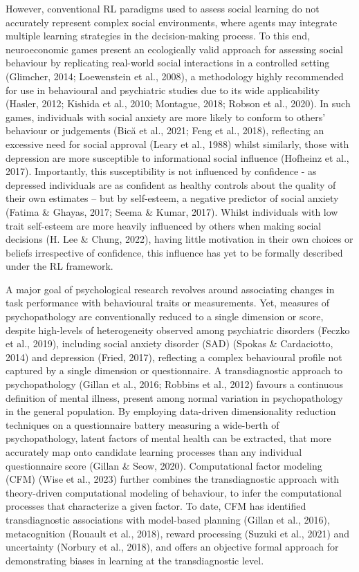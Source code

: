 \documentclass[12pt,a4paper,oneside,]{book} %
\begin{document}
However, conventional RL paradigms used to assess social learning do not accurately represent complex social environments, where agents may integrate multiple learning strategies in the decision-making process. To this end, neuroeconomic games present an ecologically valid approach for assessing social behaviour by replicating real-world social interactions in a controlled setting (Glimcher, 2014; Loewenstein et al., 2008), a methodology highly recommended for use in behavioural and psychiatric studies due to its wide applicability (Hasler, 2012; Kishida et al., 2010; Montague, 2018; Robson et al., 2020). In such games, individuals with social anxiety are more likely to conform to others' behaviour or judgements (Bică et al., 2021; Feng et al., 2018), reflecting an excessive need for social approval (Leary et al., 1988) whilst similarly, those with depression are more susceptible to informational social influence (Hofheinz et al., 2017). Importantly, this susceptibility is not influenced by confidence - as depressed individuals are as confident as healthy controls about the quality of their own estimates -- but by self-esteem, a negative predictor of social anxiety (Fatima \& Ghayas, 2017; Seema \& Kumar, 2017). Whilst individuals with low trait self-esteem are more heavily influenced by others when making social decisions (H. Lee \& Chung, 2022), having little motivation in their own choices or beliefs irrespective of confidence, this influence has yet to be formally described under the RL framework.

A major goal of psychological research revolves around associating changes in task performance with behavioural traits or measurements. Yet, measures of psychopathology are conventionally reduced to a single dimension or score, despite high-levels of heterogeneity observed among psychiatric disorders (Feczko et al., 2019), including social anxiety disorder (SAD) (Spokas \& Cardaciotto, 2014) and depression (Fried, 2017), reflecting a complex behavioural profile not captured by a single dimension or questionnaire. A transdiagnostic approach to psychopathology (Gillan et al., 2016; Robbins et al., 2012) favours a continuous definition of mental illness, present among normal variation in psychopathology in the general population. By employing data-driven dimensionality reduction techniques on a questionnaire battery measuring a wide-berth of psychopathology, latent factors of mental health can be extracted, that more accurately map onto candidate learning processes than any individual questionnaire score (Gillan \& Seow, 2020). Computational factor modeling (CFM) (Wise et al., 2023) further combines the transdiagnostic approach with theory-driven computational modeling of behaviour, to infer the computational processes that characterize a given factor. To date, CFM has identified transdiagnostic associations with model-based planning (Gillan et al., 2016), metacognition (Rouault et al., 2018), reward processing (Suzuki et al., 2021) and uncertainty (Norbury et al., 2018), and offers an objective formal approach for demonstrating biases in learning at the transdiagnostic level.
\end{document}
